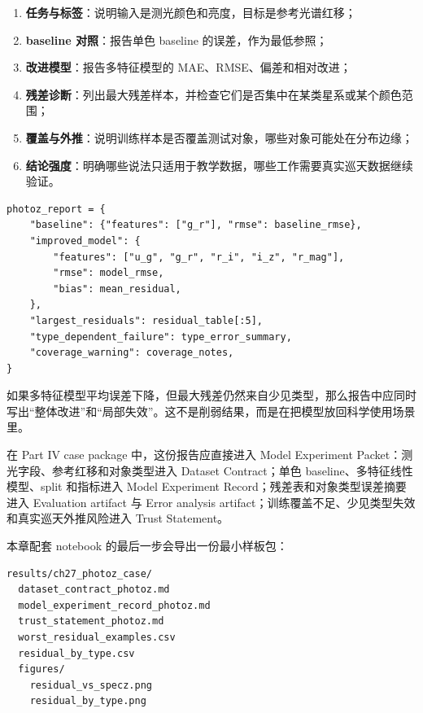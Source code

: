 \begin{enumerate}
    \item \textbf{任务与标签}：说明输入是测光颜色和亮度，目标是参考光谱红移；
    \item \textbf{baseline 对照}：报告单色 baseline 的误差，作为最低参照；
    \item \textbf{改进模型}：报告多特征模型的 MAE、RMSE、偏差和相对改进；
    \item \textbf{残差诊断}：列出最大残差样本，并检查它们是否集中在某类星系或某个颜色范围；
    \item \textbf{覆盖与外推}：说明训练样本是否覆盖测试对象，哪些对象可能处在分布边缘；
    \item \textbf{结论强度}：明确哪些说法只适用于教学数据，哪些工作需要真实巡天数据继续验证。
\end{enumerate}

\begin{examplebox}[光度红移案例报告骨架]
\begin{lstlisting}[style=pythonstyle]
photoz_report = {
    "baseline": {"features": ["g_r"], "rmse": baseline_rmse},
    "improved_model": {
        "features": ["u_g", "g_r", "r_i", "i_z", "r_mag"],
        "rmse": model_rmse,
        "bias": mean_residual,
    },
    "largest_residuals": residual_table[:5],
    "type_dependent_failure": type_error_summary,
    "coverage_warning": coverage_notes,
}
\end{lstlisting}
\end{examplebox}

如果多特征模型平均误差下降，但最大残差仍然来自少见类型，那么报告中应同时写出“整体改进”和“局部失效”。这不是削弱结果，而是在把模型放回科学使用场景里。

在 Part IV case package 中，这份报告应直接进入 Model Experiment Packet：测光字段、参考红移和对象类型进入 Dataset Contract；单色 baseline、多特征线性模型、split 和指标进入 Model Experiment Record；残差表和对象类型误差摘要进入 Evaluation artifact 与 Error analysis artifact；训练覆盖不足、少见类型失效和真实巡天外推风险进入 Trust Statement。

本章配套 notebook 的最后一步会导出一份最小样板包：

\begin{examplebox}
\begin{lstlisting}[style=terminal]
results/ch27_photoz_case/
  dataset_contract_photoz.md
  model_experiment_record_photoz.md
  trust_statement_photoz.md
  worst_residual_examples.csv
  residual_by_type.csv
  figures/
    residual_vs_specz.png
    residual_by_type.png
\end{lstlisting}
\end{examplebox}

